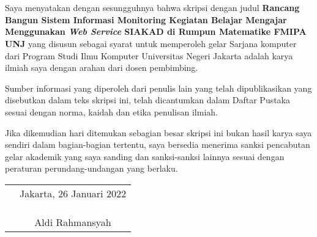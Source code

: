 \chapter*{}

Saya menyatakan dengan sesungguhnya bahwa skripsi dengan judul 	\textbf{Rancang Bangun Sistem Informasi Monitoring Kegiatan Belajar Mengajar Menggunakan \textit{Web Service} SIAKAD di Rumpun Matematike FMIPA UNJ} yang disusun sebagai syarat untuk memperoleh gelar Sarjana komputer dari Program Studi Ilmu Komputer Universitas Negeri Jakarta adalah karya ilmiah saya dengan arahan dari dosen pembimbing.

Sumber informasi yang diperoleh dari penulis lain yang
telah dipublikasikan yang disebutkan dalam teks skripsi ini, telah dicantumkan dalam Daftar Pustaka sesuai dengan norma, kaidah dan etika penulisan ilmiah.

Jika dikemudian hari ditemukan sebagian besar skripsi ini bukan hasil karya saya sendiri dalam bagian-bagian tertentu, saya bersedia menerima sanksi pencabutan gelar akademik yang saya sanding dan sanksi-sanksi lainnya sesuai dengan peraturan perundang-undangan yang berlaku.

\vspace{.5cm}

\begin{tabular}{p{7.5cm}c}
	&Jakarta, 26 Januari 2022\\
	&\\
	&\\
	&\\
	&Aldi Rahmansyah
\end{tabular}